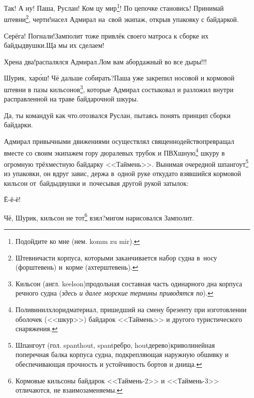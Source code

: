 
\renewcommand*{\thefootnote}{\arabic{footnote}}
\setcounter{footnote}{0}
\diagdash Так! А ну! Паша, Руслан! Ком цу мир\footnote{Подойдите ко мне (нем. komm zu mir).}! По цепочке становись! Принимай штевни\footnote{Штевни\mdash части корпуса, которыми заканчивается набор судна в~носу (форштевень) и~корме (ахтерштевень).}, черти!\mdash насел Адмирал на~свой экипаж, открыв упаковку с байдаркой.

\diagdash Серёга! Погнали!\mdash Замполит тоже привлёк своего матроса к сборке их байды\sdash двушки.\mdash Ща мы их сделаем!

\diagdash Хрена два!\mdash распалялся Адмирал.\mdash Лом вам абордажный во все дыры!!! 

\renewcommand*{\thefootnote}{\arabic{footnote}}
\setcounter{footnote}{0}
\diagdash Шурик, хар\'{о}ш! Чё дальше собирать?\mdash Паша уже закрепил носовой и кормовой штевни в пазы кильсонов\footnote{Кильсон (англ. keelson)\mdash продольная составная часть одинарного дна корпуса речного судна (\textit{здесь и далее морские термины приводятся по}\cite{МорскойСправочник}).}, которые Адмирал состыковал и разложил внутри расправленной на траве байдарочной шкуры.

\diagdash Да, ты командуй как что.\mdash отозвался Руслан, пытаясь понять принцип сборки байдарки.

Адмирал привычными движениями осуществлял священнодейство\mdash превращал вместе со своим экипажем гору дюралевых трубок и ПВХ\sdash шную\footnote{Поливинилхлорид\mdash материал, пришедший на смену брезенту при изготовлении оболочек (<<шкур>>) байдарок <<Таймень>> и другого туристического снаряжения.} шкуру в огромную трёхместную байдарку <<Таймень>>. Вынимая очередной шпангоут\footnote{Шпангоут (гол. spanthout, spant\mdash ребро, hout\mdash дерево)\mdash криволинейная поперечная балка корпуса судна, подкрепляющая наружную обшивку и обеспечивающая прочность и устойчивость бортов и днища.} из упаковки, он вдруг завис, держа в~одной руке откуда\sdash то взявшийся кормовой кильсон от~байды\sdash двушки и~почесывая другой рукой затылок:

\diagdash Ё-ё-ё!

\diagdash Чё, Шурик, кильсон не тот\footnote{Кормовые кильсоны байдарок <<Таймень-2>> и <<Таймень-3>> отличаются, не взаимозаменяемы.} взял?\mdash мигом нарисовался Замполит.

